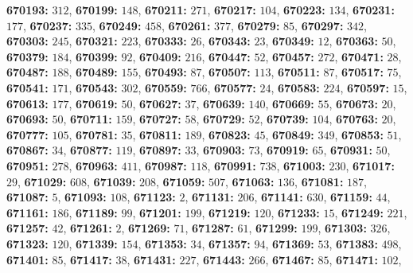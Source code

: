 \textsf{\bfseries 670193:} $312$, \textsf{\bfseries 670199:} $148$, \textsf{\bfseries 670211:} $271$, \textsf{\bfseries 670217:} $104$, \textsf{\bfseries 670223:} $134$, \textsf{\bfseries 670231:} $177$, \textsf{\bfseries 670237:} $335$, \textsf{\bfseries 670249:} $458$, \textsf{\bfseries 670261:} $377$, \textsf{\bfseries 670279:} $85$, \textsf{\bfseries 670297:} $342$, \textsf{\bfseries 670303:} $245$, \textsf{\bfseries 670321:} $223$, \textsf{\bfseries 670333:} $26$, \textsf{\bfseries 670343:} $23$, \textsf{\bfseries 670349:} $12$, \textsf{\bfseries 670363:} $50$, \textsf{\bfseries 670379:} $184$, \textsf{\bfseries 670399:} $92$, \textsf{\bfseries 670409:} $216$, \textsf{\bfseries 670447:} $52$, \textsf{\bfseries 670457:} $272$, \textsf{\bfseries 670471:} $28$, \textsf{\bfseries 670487:} $188$, \textsf{\bfseries 670489:} $155$, \textsf{\bfseries 670493:} $87$, \textsf{\bfseries 670507:} $113$, \textsf{\bfseries 670511:} $87$, \textsf{\bfseries 670517:} $75$, \textsf{\bfseries 670541:} $171$, \textsf{\bfseries 670543:} $302$, \textsf{\bfseries 670559:} $766$, \textsf{\bfseries 670577:} $24$, \textsf{\bfseries 670583:} $224$, \textsf{\bfseries 670597:} $15$, \textsf{\bfseries 670613:} $177$, \textsf{\bfseries 670619:} $50$, \textsf{\bfseries 670627:} $37$, \textsf{\bfseries 670639:} $140$, \textsf{\bfseries 670669:} $55$, \textsf{\bfseries 670673:} $20$, \textsf{\bfseries 670693:} $50$, \textsf{\bfseries 670711:} $159$, \textsf{\bfseries 670727:} $58$, \textsf{\bfseries 670729:} $52$, \textsf{\bfseries 670739:} $104$, \textsf{\bfseries 670763:} $20$, \textsf{\bfseries 670777:} $105$, \textsf{\bfseries 670781:} $35$, \textsf{\bfseries 670811:} $189$, \textsf{\bfseries 670823:} $45$, \textsf{\bfseries 670849:} $349$, \textsf{\bfseries 670853:} $51$, \textsf{\bfseries 670867:} $34$, \textsf{\bfseries 670877:} $119$, \textsf{\bfseries 670897:} $33$, \textsf{\bfseries 670903:} $73$, \textsf{\bfseries 670919:} $65$, \textsf{\bfseries 670931:} $50$, \textsf{\bfseries 670951:} $278$, \textsf{\bfseries 670963:} $411$, \textsf{\bfseries 670987:} $118$, \textsf{\bfseries 670991:} $738$, \textsf{\bfseries 671003:} $230$, \textsf{\bfseries 671017:} $29$, \textsf{\bfseries 671029:} $608$, \textsf{\bfseries 671039:} $208$, \textsf{\bfseries 671059:} $507$, \textsf{\bfseries 671063:} $136$, \textsf{\bfseries 671081:} $187$, \textsf{\bfseries 671087:} $5$, \textsf{\bfseries 671093:} $108$, \textsf{\bfseries 671123:} $2$, \textsf{\bfseries 671131:} $206$, \textsf{\bfseries 671141:} $630$, \textsf{\bfseries 671159:} $44$, \textsf{\bfseries 671161:} $186$, \textsf{\bfseries 671189:} $99$, \textsf{\bfseries 671201:} $199$, \textsf{\bfseries 671219:} $120$, \textsf{\bfseries 671233:} $15$, \textsf{\bfseries 671249:} $221$, \textsf{\bfseries 671257:} $42$, \textsf{\bfseries 671261:} $2$, \textsf{\bfseries 671269:} $71$, \textsf{\bfseries 671287:} $61$, \textsf{\bfseries 671299:} $199$, \textsf{\bfseries 671303:} $326$, \textsf{\bfseries 671323:} $120$, \textsf{\bfseries 671339:} $154$, \textsf{\bfseries 671353:} $34$, \textsf{\bfseries 671357:} $94$, \textsf{\bfseries 671369:} $53$, \textsf{\bfseries 671383:} $498$, \textsf{\bfseries 671401:} $85$, \textsf{\bfseries 671417:} $38$, \textsf{\bfseries 671431:} $227$, \textsf{\bfseries 671443:} $266$, \textsf{\bfseries 671467:} $85$, \textsf{\bfseries 671471:} $102$, 
